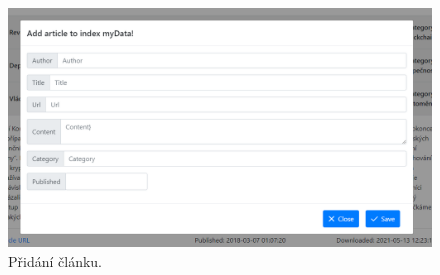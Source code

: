 \documentclass[
12pt,
a4paper,
pdftex,
czech,
titlepage
]{report}
\begin{document}
\begin{figure}
    \centering
	\includegraphics[width=13.5cm]{img/IR_article_add.png}
	\caption{Přidání článku.}
	\label{add}
\end{figure}
\end{document}
